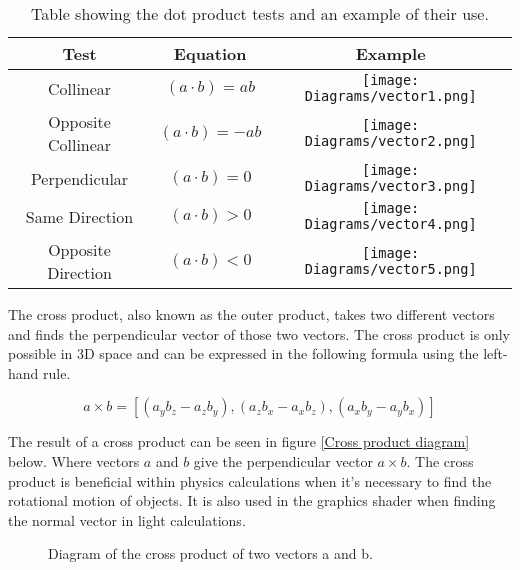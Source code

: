 \begin{table}[h!]
\centering
\begin{tabular}{ | c | c | c |}
\hline
	Test 	& Equation & Example\\  
\hline
\hline
	Collinear 							& $(a \cdot b) = ab$ & \texttt{[image: Diagrams/vector1.png]}\\
\hline
	Opposite Collinear 					& $(a \cdot b) = -ab$ &	\texttt{[image: Diagrams/vector2.png]}\\
\hline
	Perpendicular 						& $(a \cdot b) = 0$	&\texttt{[image: Diagrams/vector3.png]}\\
\hline
	Same Direction 						& $(a \cdot b) > 0$ &\texttt{[image: Diagrams/vector4.png]}\\
\hline
	Opposite Direction 					& $(a \cdot b) < 0$ &\texttt{[image: Diagrams/vector5.png]}\\
\hline

\end{tabular}
\caption{Table showing the dot product tests and an example of their use.}
\label{dot product test}
\end{table}
\FloatBarrier

\noindent
The cross product, also known as the outer product, takes two different vectors and finds the perpendicular vector of those two vectors. The cross product is only possible in 3D space and can be expressed in the following formula using the left-hand rule.

\begin{equation}
a \times b = [(a_y b_z - a_z b_y), (a_z b_x - a_x b_z), (a_x b_y - a_y b_x)]
\end{equation}

\noindent
The result of a cross product can be seen in figure \ref{Cross product diagram} below. Where vectors $a$ and $b$ give the perpendicular vector $a \times b$. The cross product is beneficial within physics calculations when it's necessary to find the rotational motion of objects. It is also used in the graphics shader when finding the normal vector in light calculations.


\begin{figure}[htbp]
	{\centering
		\setlength{\fboxrule}{1pt}
		\vspace{7px}
		\caption{Diagram of the cross product of two vectors a and b.}
	}
\end{figure}
\FloatBarrier

